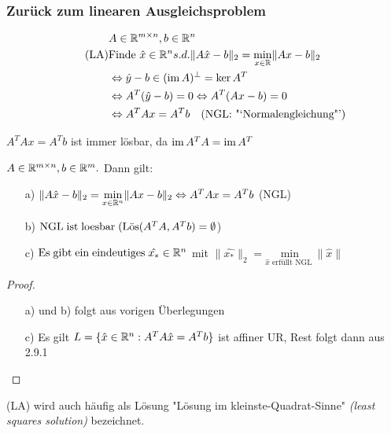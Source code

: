 \subsubsection{Zurück zum linearen Ausgleichsproblem}
\begin{align*}
&A \in \mathbb R^{m \times n}, b \in \mathbb R^n\\
\tag{LA}
&\text{Finde } \hat{x} \in \mathbb R^n s.d. \|A\hat{x}-b\|_2 = \underset{x \in \mathbb R}{\mathrm{min}}\|Ax-b\|_2\\
&\Leftrightarrow \hat{y}-b \in (\operatorname*{\mathrm{im}} A)^{\perp} = \ker A^T\\
&\Leftrightarrow A^T(\hat{y}-b)=0 \Leftrightarrow A^T(Ax-b)=0\\
&\Leftrightarrow A^TAx=A^Tb \quad \text{(NGL:  "`Normalengleichung"')}
\end{align*}
\begin{Bemerkung}
$A^TAx=A^Tb$ ist immer lösbar, da $\operatorname*{\mathrm{im}} A^TA=\operatorname*{\mathrm{im}} A^T$
\end{Bemerkung}
\begin{Satz}
$A \in \mathbb R^{m \times n}, b \in \mathbb R^m.$ Dann gilt:
\begin{itemize}
\item[a)]$\|A\hat{x}-b\|_2= \underset{x \in \mathbb R^n}{\mathrm{min}}\|Ax-b\|_2 \Leftrightarrow A^TAx=A^Tb$ (NGL)
\item[b)] $\mathrm{NGL\;ist\;loesbar\;} (\mathrm{L\ddot{o}s}(A^TA,A^Tb) = \emptyset$)
\item[c)] $\mathrm{Es\;gibt\;ein\;eindeutiges\;} \hat{x_{*}} \in \mathbb R^n$ mit $ \|\hat{x_{*}}\|_2 = \underset{\hat{x} \text{ erfüllt NGL }}{\mathrm{min}}\|\hat{x}\|$
\end{itemize}
\end{Satz}
\begin{proof}
	\begin{itemize}
		\item[a) und b)] folgt aus vorigen Überlegungen
		\item[c)] Es gilt $L=\{\hat{x}\in \mathbb R^n:A^TA\hat{x}=A^Tb\}$ ist affiner UR, Rest folgt dann aus 2.9.1
	\end{itemize}
\end{proof}
\begin{Bemerkung}
	(LA) wird auch häufig als Lösung "Lösung im kleinste-Quadrat-Sinne"
	\textit{(least squares solution)} bezeichnet.
\end{Bemerkung}
